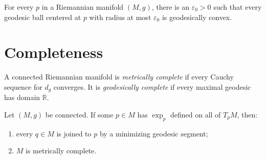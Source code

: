 \begin{theorem}
\label{thm:small-geodesic-ball-convex}
For every $p$ in a Riemannian manifold $(M,g)$, there is an
$\varepsilon_0>0$ such that every geodesic ball centered at $p$ with radius at
most $\varepsilon_0$ is geodesically convex.
\end{theorem}

\section{Completeness}

A connected Riemannian manifold is \emph{metrically complete} if every Cauchy
sequence for $d_g$ converges. It is \emph{geodesically complete} if every
maximal geodesic has domain $\mathbb R$.

\begin{lemma}
\label{lem:exponential-map-implies-completeness}
\leanok
Let $(M,g)$ be connected. If some $p\in M$ has $\exp_p$ defined on all of
$T_pM$, then:
\begin{enumerate}
\item[(a)] every $q\in M$ is joined to $p$ by a minimizing geodesic segment;
\item[(b)] $M$ is metrically complete.
\end{enumerate}
\end{lemma}

